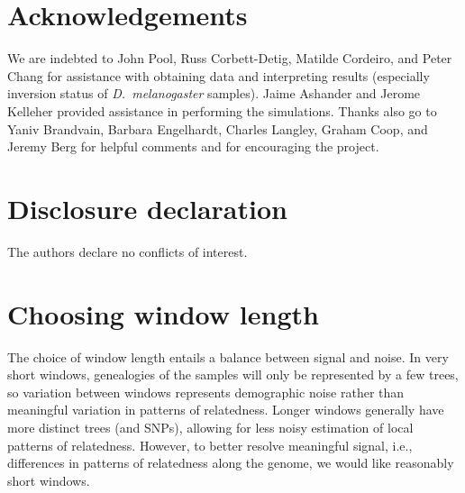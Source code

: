 \documentclass[11pt, oneside]{article}   	%
\newif\ifsubmission
\begin{document}
\section*{Acknowledgements}

We are indebted to John Pool, Russ Corbett-Detig, Matilde Cordeiro, and Peter Chang 
for assistance with obtaining data and interpreting results
(especially inversion status of \textit{D.~melanogaster} samples).
Jaime Ashander and Jerome Kelleher provided assistance in performing the simulations.
Thanks also go to Yaniv Brandvain, Barbara Engelhardt, Charles Langley, Graham Coop, and Jeremy Berg for helpful comments
and for encouraging the project.

\section*{Disclosure declaration}

The authors declare no conflicts of interest.


  
\ifsubmission
    \clearpage
    \newcounter{bibend}
    \setcounter{bibend}{\value{page}}
\fi

\ifsubmission\processdelayedfloats\fi

\ifsubmission
    \clearpage
    \setcounter{page}{\thebibend}
\fi

\appendix
\setcounter{table}{0}
\renewcommand{\thetable}{S\arabic{table}}
\setcounter{figure}{0}
\renewcommand{\thefigure}{S\arabic{figure}}
\ifsubmission
    \setcounter{postfigure}{0}
    \renewcommand{\thepostfigure}{S\arabic{postfigure}}
\fi

\section{Choosing window length}
\label{apx:window_length}

The choice of window length entails a balance between signal and noise.
In very short windows, genealogies of the samples will only be represented by a few trees,
so variation between windows represents demographic noise rather than meaningful variation in patterns of relatedness.
Longer windows generally have more distinct trees (and SNPs), 
allowing for less noisy estimation of local patterns of relatedness.
However, to better resolve meaningful signal, i.e., differences in patterns of relatedness along the genome,
we would like reasonably short windows.
\end{document}
